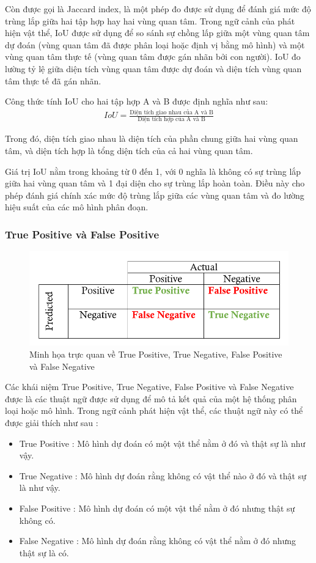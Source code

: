 \documentclass[a4paper]{article}
\begin{document}
Còn được gọi là Jaccard index, là một phép đo được sử dụng để đánh giá mức độ trùng lắp giữa hai tập hợp hay hai vùng quan tâm. Trong ngữ cảnh của phát hiện vật thể, IoU được sử dụng để so sánh sự chồng lấp giữa một vùng quan tâm dự đoán (vùng quan tâm đã được phân loại hoặc định vị bằng mô hình) và một vùng quan tâm thực tế (vùng quan tâm được gán nhãn bởi con người). IoU đo lường tỷ lệ giữa diện tích vùng quan tâm được dự đoán và diện tích vùng quan tâm thực tế đã gán nhãn.

Công thức tính IoU cho hai tập hợp A và B được định nghĩa như sau: 
\begin{align*}
	IoU = \frac{\text{Diện tích giao nhau của A và B}}{\text{Diện tích hợp của A và B}}
\end{align*}


Trong đó, diện tích giao nhau là diện tích của phần chung giữa hai vùng quan tâm, và diện tích hợp là tổng diện tích của cả hai vùng quan tâm.

Giá trị IoU nằm trong khoảng từ 0 đến 1, với 0 nghĩa là không có sự trùng lắp giữa hai vùng quan tâm và 1 đại diện cho sự trùng lắp hoàn toàn. Điều này cho phép đánh giá chính xác mức độ trùng lắp giữa các vùng quan tâm và đo lường hiệu suất của các mô hình phân đoạn.

\subsubsection{\textbf{True Positive và False Positive}}

\begin{figure}[h]
	\centering
	\includegraphics[width=0.7\linewidth]{fig/positive-negative-true-false-matrix}
	\caption{Minh họa trực quan về True Positive, True Negative, False Positive và False Negative}
	\label{fig:positive-negative-true-false-matrix}
\end{figure}

Các khái niệm True Positive, True Negative, False Positive và False Negative được là các thuật ngữ được sử dụng để mô tả kết quả của một hệ thống phân loại hoặc mô hình. Trong ngữ cảnh phát hiện vật thể, các thuật ngữ này có thể được giải thích như sau :
\begin{itemize}
	\item True Positive : Mô hình dự đoán có một vật thể nằm ở đó và thật sự là như vậy.
	\item  True Negative : Mô hình dự đoán rằng không có vật thể nào ở đó và thật sự là như vậy.
	\item False Positive : Mô hình dự đoán có một vật thể nằm ở đó nhưng thật sự không có.
	\item False Negative : Mô hình dự đoán rằng không có vật thể nằm ở đó nhưng thật sự là có.
\end{itemize}
\end{document}
